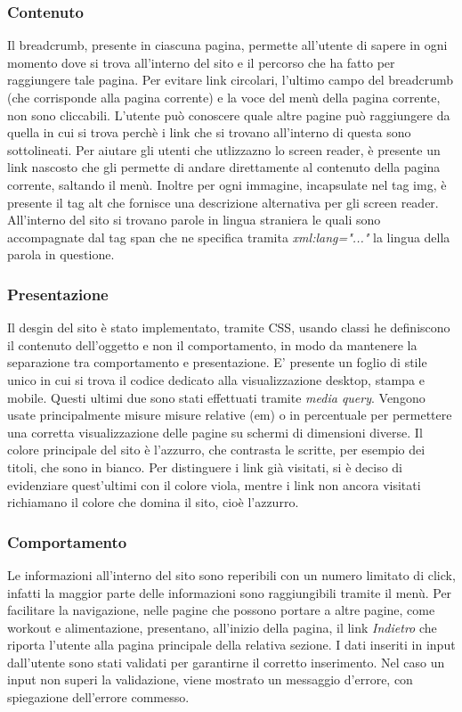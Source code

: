 \subsubsection{Contenuto}
Il breadcrumb, presente in ciascuna pagina, permette all'utente di sapere in ogni momento dove si trova all'interno del sito e il percorso che ha fatto per raggiungere tale pagina. Per evitare link circolari, l'ultimo campo del breadcrumb (che corrisponde alla pagina corrente) e la voce del menù della pagina corrente, non sono cliccabili. L'utente può conoscere quale altre pagine può raggiungere da quella in cui si trova perchè i link che si trovano all'interno di questa sono sottolineati. 
Per aiutare gli utenti che utlizzazno lo screen reader, è presente un link nascosto che gli permette di andare direttamente al contenuto della pagina corrente, saltando il menù. Inoltre per ogni immagine, incapsulate nel tag img, è presente il tag alt che fornisce una  descrizione alternativa per gli screen reader. 
All'interno del sito si trovano parole in lingua straniera le quali sono accompagnate dal tag span che ne specifica tramita \textit{xml:lang="..."} la lingua della parola in questione. 


\subsubsection{Presentazione}
Il desgin del sito è stato implementato, tramite CSS, usando classi he definiscono il contenuto
dell’oggetto e non il comportamento, in modo da mantenere la separazione tra comportamento e presentazione. E' presente un foglio di stile unico in cui si trova il codice dedicato alla visualizzazione desktop, stampa e mobile. Questi ultimi due sono stati effettuati tramite \textit{media query}. Vengono usate principalmente misure  misure relative (em) o in percentuale per permettere una corretta visualizzazione delle pagine su schermi di dimensioni diverse. 
Il colore principale del sito è l'azzurro, che contrasta le scritte, per esempio dei titoli, che sono in bianco. Per distinguere i link già visitati, si è deciso di evidenziare quest'ultimi con il colore viola, mentre i link non ancora visitati richiamano il colore che domina il sito, cioè l'azzurro. 


\subsubsection{Comportamento}
Le informazioni all'interno del sito sono reperibili con un numero
limitato di click, infatti la maggior parte delle informazioni sono raggiungibili tramite il menù. 
Per facilitare la navigazione, nelle pagine che possono portare a altre pagine, come workout e alimentazione, presentano, all'inizio della pagina, il link \textit{Indietro} che riporta l'utente alla pagina principale della relativa sezione. 
I dati inseriti in input dall'utente sono stati validati per garantirne il corretto inserimento. Nel caso un input non superi la validazione, viene mostrato un messaggio d'errore, con spiegazione dell’errore commesso.

